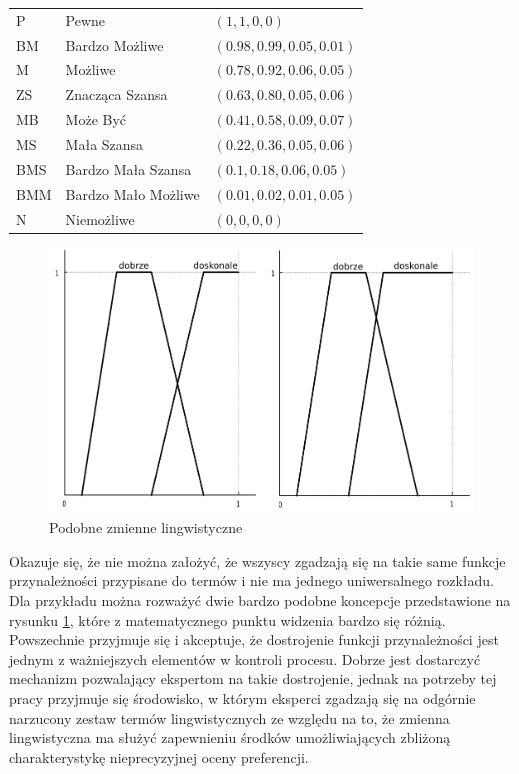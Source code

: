\begin{tabular}{lll}
P 	&	Pewne				 &	$(1, 1, 0, 0)$ \\
BM 	&	Bardzo Możliwe	 	 &	$(0.98, 0.99, 0.05, 0.01)$ \\
M 	&	Możliwe 			 &	$(0.78, 0.92, 0.06, 0.05)$ \\
ZS 	&	Znacząca Szansa 	 &	$(0.63,0.80,0.05,0.06)$ \\
MB 	&	Może Być 			 &	$(0.41, 0.58, 0.09, 0.07)$ \\
MS 	&	Mała Szansa			 &	$(0.22, 0.36, 0.05, 0.06)$ \\
BMS &	Bardzo Mała Szansa 	 &	$(0.1,0.18, 0.06, 0.05)$ \\
BMM &	Bardzo Mało Możliwe	 &	$(0.01, 0.02, 0.01,0.05)$ \\
N 	&	Niemożliwe 			 &	$(0, 0, 0, 0)$
\end{tabular}

\begin{figure}[ht]
  \includegraphics[width=\linewidth]
    {chapters/preferences/rozklad_podobnych_zmiennych}
  \caption{Podobne zmienne lingwistyczne}
  \label{fig:podobne_zmienne_lingwistyczne}
\end{figure}
Okazuje się, że nie można założyć, że wszyscy zgadzają się na takie same funkcje
przynależności przypisane do termów i nie ma jednego uniwersalnego rozkładu. Dla
przykładu można rozważyć dwie bardzo podobne koncepcje przedstawione na rysunku
\ref{fig:podobne_zmienne_lingwistyczne}, które z matematycznego punktu
widzenia bardzo się różnią. Powszechnie przyjmuje się i akceptuje, że
dostrojenie funkcji przynależności jest jednym z ważniejszych elementów w
kontroli procesu. Dobrze jest dostarczyć mechanizm pozwalający ekspertom na
takie dostrojenie, jednak na potrzeby tej pracy przyjmuje się środowisko, w
którym eksperci zgadzają się na odgórnie narzucony zestaw termów lingwistycznych
ze względu na to, że zmienna lingwistyczna ma służyć zapewnieniu środków
umożliwiających zbliżoną charakterystykę nieprecyzyjnej oceny preferencji.

